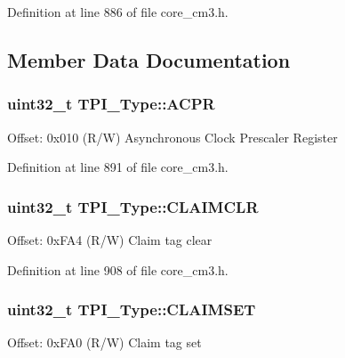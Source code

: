 Definition at line 886 of file core\+\_\+cm3.\+h.



\subsection{Member Data Documentation}
\subsubsection[{\texorpdfstring{A\+C\+PR}{ACPR}}]{ uint32\+\_\+t T\+P\+I\+\_\+\+Type\+::\+A\+C\+PR}\hypertarget{structTPI__Type_ad75832a669eb121f6fce3c28d36b7fab}{}\label{structTPI__Type_ad75832a669eb121f6fce3c28d36b7fab}
Offset\+: 0x010 (R/W) Asynchronous Clock Prescaler Register 

Definition at line 891 of file core\+\_\+cm3.\+h.

\subsubsection[{\texorpdfstring{C\+L\+A\+I\+M\+C\+LR}{CLAIMCLR}}]{ uint32\+\_\+t T\+P\+I\+\_\+\+Type\+::\+C\+L\+A\+I\+M\+C\+LR}\hypertarget{structTPI__Type_a44efa6045512c8d4da64b0623f7a43ad}{}\label{structTPI__Type_a44efa6045512c8d4da64b0623f7a43ad}
Offset\+: 0x\+F\+A4 (R/W) Claim tag clear 

Definition at line 908 of file core\+\_\+cm3.\+h.

\subsubsection[{\texorpdfstring{C\+L\+A\+I\+M\+S\+ET}{CLAIMSET}}]{ uint32\+\_\+t T\+P\+I\+\_\+\+Type\+::\+C\+L\+A\+I\+M\+S\+ET}\hypertarget{structTPI__Type_a2e4d5a07fabd771fa942a171230a0a84}{}\label{structTPI__Type_a2e4d5a07fabd771fa942a171230a0a84}
Offset\+: 0x\+F\+A0 (R/W) Claim tag set 


